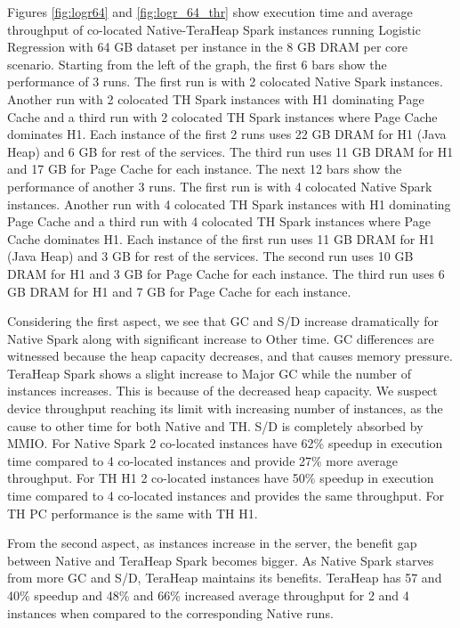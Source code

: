 Figures \ref{fig:logr64} and \ref{fig:logr_64_thr} show execution time and average throughput of co-located
Native-TeraHeap Spark instances running Logistic Regression with 64 GB
dataset per instance in the 8 GB DRAM per core scenario.
Starting from the left of the graph, the first 6 bars show the
performance of 3 runs. The first run is with 2 colocated Native Spark instances.
Another run with 2 colocated TH Spark instances with H1 dominating Page Cache
and a third run with 2 colocated TH Spark instances where Page Cache dominates H1.
Each instance of the first 2 runs uses 22 GB DRAM for H1 (Java Heap) and 6 GB for rest of the services.
The third run uses 11 GB DRAM for H1 and 17 GB for Page Cache for each instance. 
The next 12 bars show the performance of another 3 runs. The first run is with 4 colocated Native Spark instances.
Another run with 4 colocated TH Spark instances with H1 dominating Page Cache
and a third run with 4 colocated TH Spark instances where Page Cache dominates H1.
Each instance of the first run uses 11 GB DRAM for H1 (Java Heap) and 3 GB for rest of the services.
The second run uses 10 GB DRAM for H1 and 3 GB for Page Cache for each instance.
The third run uses 6 GB DRAM for H1 and 7 GB for Page Cache for each instance.

Considering the first aspect, we see that GC and S/D increase dramatically for Native Spark along with significant increase to Other time. GC differences are witnessed because the heap capacity decreases, and that causes memory pressure. TeraHeap Spark shows a slight increase to Major GC while the number of instances increases. This is because of the decreased heap capacity. We suspect device throughput reaching its limit with increasing number of instances, as the cause to other time for both Native and TH. S/D is completely absorbed by MMIO. For Native Spark 2 co-located instances have 62\% speedup in execution time compared to 4 co-located instances and provide 27\% more average throughput. For TH H1 2 co-located instances have 50\% speedup in execution time compared to 4 co-located instances and provides the same throughput. For TH PC performance is the same with TH H1. 

From the second aspect, as instances increase in the server, the benefit gap between Native and TeraHeap Spark becomes bigger. As Native Spark starves from more GC and S/D, TeraHeap maintains its benefits. TeraHeap has 57 and 40\% speedup and 48\% and 66\% increased average throughput for 2 and 4 instances when compared to the corresponding Native runs.

